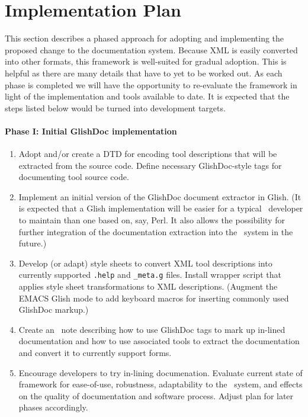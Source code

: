 \section{Implementation Plan}

This section describes a phased approach for adopting and implementing
the proposed change to the documentation system.  Because XML is
easily converted into other formats, this framework is well-suited for
gradual adoption.  This is helpful as there are many details that have
to yet to be worked out.  As each phase is completed we will have the
opportunity to re-evaluate the framework in light of the
implementation and tools available to date.  It is expected that the
steps listed below would be turned into development targets.

\paragraph{Phase I: Initial GlishDoc implementation}

\begin{enumerate}

\item Adopt and/or create a DTD for encoding tool descriptions that will 
be extracted from the source code.  Define necessary GlishDoc-style
tags for documenting tool source code.  

\item Implement an initial version of the GlishDoc document extractor
in Glish.  (It is expected that a Glish implementation will be easier
for a typical \aipspp\ developer to maintain than one based on, say,
Perl.  It also allows the possibility for further integration of the
documentation extraction into the \aipspp\ system in the future.)  

\item Develop (or adapt) style sheets to convert XML tool
descriptions into currently supported {\tt .help} and {\tt \_meta.g}
files.  Install wrapper script that applies style sheet
transformations to XML descriptions.  (Augment the EMACS Glish mode to
add keyboard macros for inserting commonly used GlishDoc markup.)

\item Create an \aipspp\ note describing how to use GlishDoc tags to
mark up in-lined documentation and how to use associated tools to
extract the documentation and convert it to currently support forms. 

\item Encourage developers to try in-lining documenation.  Evaluate
current state of framework for ease-of-use, robustness, adaptability
to the \aipspp\ system, and effects on the quality of documentation and
software process.  Adjust plan for later phases accordingly.

\end{enumerate}


